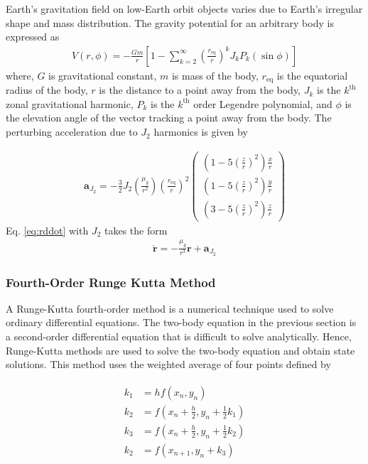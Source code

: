 \documentclass[]{aiaa-tc}%
\begin{document}
Earth's gravitation field on low-Earth orbit objects varies due to Earth's irregular shape and mass distribution. The gravity potential for an arbitrary body is expressed as \cite{schaub_analytical_2009}
\begin{align}
V(r,\phi)=-\frac{Gm}{r}\left[1-\sum\limits_{k=2}^\infty\left(\frac{r_{\text{eq}}}{r}\right)^k J_k P_k (\sin\phi)\right]
\end{align}
where, $G$ is gravitational constant, $m$ is mass of the body, $r_{\text{eq}}$ is the equatorial radius of the body, $r$ is the distance to a point away from the body, $J_k$ is the $k^{\text{th}}$ zonal gravitational harmonic, $P_k$ is the $k^{\text{th}}$ order Legendre polynomial, and $\phi$ is the elevation angle of the vector tracking a point away from the body. The perturbing acceleration due to $J_2$ harmonics is given by

\begin{align}
\mathbf{a}_{J_2}=-\frac{3}{2}J_2\left(\frac{\mu_g}{r^2}\right)\left(\frac{r_{\text{eq}}}{r}\right)^2\left(\begin{array}{c}
\left(1-5\left(\frac{z}{r}\right)^2\right)\frac{x}{r}\\
\left(1-5\left(\frac{z}{r}\right)^2\right)\frac{y}{r}\\
\left(3-5\left(\frac{z}{r}\right)^2\right)\frac{z}{r} \end{array}\right)
\end{align}
Eq. \eqref{eq:rddot} with $J_2$ takes the form
\begin{gather}
\mathbf{\ddot{r}}=-\frac{\mu_g}{r^3}\mathbf{r}+\mathbf{a}_{J_2}
\end{gather}

\subsubsection{Fourth-Order Runge Kutta Method}

A Runge-Kutta fourth-order method is a numerical technique used to solve ordinary differential equations. The two-body equation in the previous section is a second-order differential equation that is difficult to solve analytically. Hence, Runge-Kutta methods are used to solve the two-body equation and obtain state solutions. This method uses the weighted average of four points defined by \cite{greenberg_advanced_1998}

\begin{subequations}
\begin{gather}
\label{eq:range_kutta}
\begin{aligned}
k_1 &= hf(x_n,y_n)\\
k_2 &= f(x_n+\frac{h}{2},y_n+\frac{1}{2}k_1)\\
k_3 &= f(x_n+\frac{h}{2},y_n+\frac{1}{2}k_2)\\
k_2 &= f(x_{n+1},y_n+k_3)
\end{aligned}
\end{gather}
\end{subequations}
\end{document}
